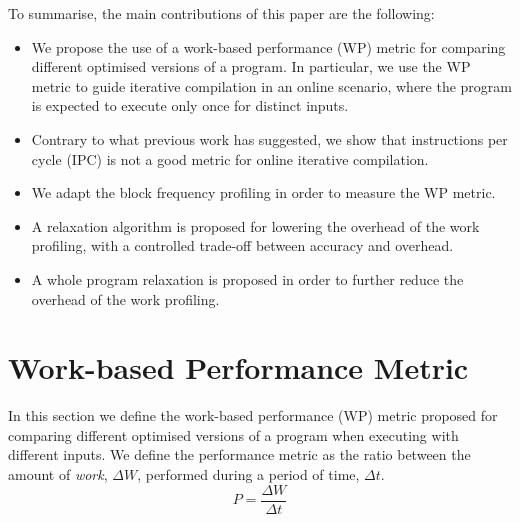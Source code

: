 \documentclass[sigplan,10pt]{acmart}
\theoremstyle{definition}
\newcommand{\itercomp}{{iterative compilation}}
\begin{document}

To summarise, the main contributions of this paper are the following:
\begin{itemize}
\item We propose the use of a work-based performance (WP) metric for comparing different optimised versions of a program.
      In particular, we use the WP metric to guide {\itercomp} in an online scenario, where the program is expected to execute only once for distinct inputs.

\item Contrary to what previous work has suggested, we show that instructions per cycle (IPC) is not a good metric for online {\itercomp}.
\item We adapt the block frequency profiling in order to measure the WP metric.
\item A relaxation algorithm is proposed for lowering the overhead of the work profiling, with a controlled trade-off between accuracy and overhead.
\item A whole program relaxation is proposed in order to further reduce the overhead of the work profiling.
\end{itemize}


\section{Work-based Performance Metric} \label{sec:metric}

In this section we define the work-based performance (WP) metric proposed for comparing different optimised versions of a program when executing with different inputs.
We define the performance metric as the ratio between the amount of \textit{work}, $\Delta W$, performed during a period of time, $\Delta t$.
\[
   P = \frac{\Delta W}{\Delta t}
\]
\end{document}
